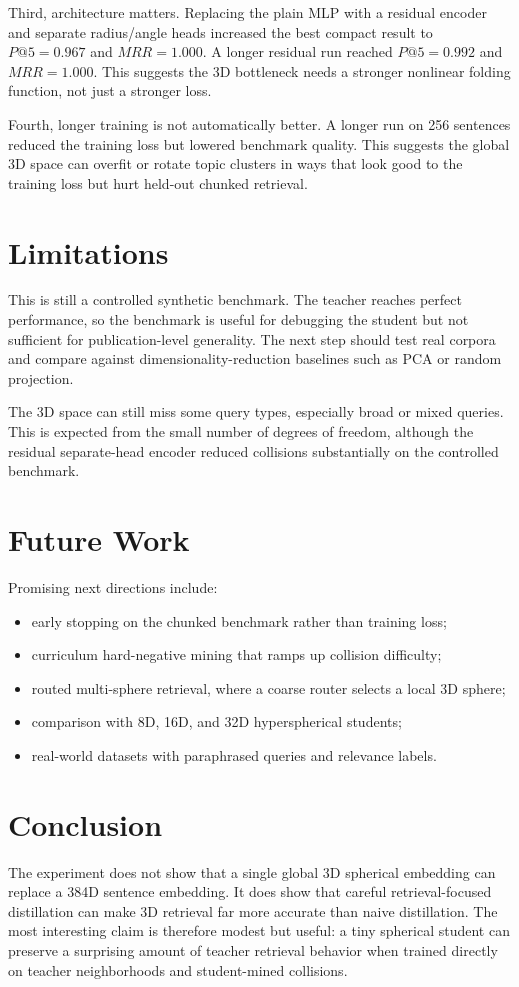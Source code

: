 \documentclass[11pt]{article}
\begin{document}
Third, architecture matters. Replacing the plain MLP with a residual encoder and separate radius/angle heads increased the best compact result to $P@5=0.967$ and $MRR=1.000$. A longer residual run reached $P@5=0.992$ and $MRR=1.000$. This suggests the 3D bottleneck needs a stronger nonlinear folding function, not just a stronger loss.

Fourth, longer training is not automatically better. A longer run on 256 sentences reduced the training loss but lowered benchmark quality. This suggests the global 3D space can overfit or rotate topic clusters in ways that look good to the training loss but hurt held-out chunked retrieval.

\section{Limitations}
This is still a controlled synthetic benchmark. The teacher reaches perfect performance, so the benchmark is useful for debugging the student but not sufficient for publication-level generality. The next step should test real corpora and compare against dimensionality-reduction baselines such as PCA or random projection.

The 3D space can still miss some query types, especially broad or mixed queries. This is expected from the small number of degrees of freedom, although the residual separate-head encoder reduced collisions substantially on the controlled benchmark.

\section{Future Work}
Promising next directions include:
\begin{itemize}
\item early stopping on the chunked benchmark rather than training loss;
\item curriculum hard-negative mining that ramps up collision difficulty;
\item routed multi-sphere retrieval, where a coarse router selects a local 3D sphere;
\item comparison with 8D, 16D, and 32D hyperspherical students;
\item real-world datasets with paraphrased queries and relevance labels.
\end{itemize}

\section{Conclusion}
The experiment does not show that a single global 3D spherical embedding can replace a 384D sentence embedding. It does show that careful retrieval-focused distillation can make 3D retrieval far more accurate than naive distillation. The most interesting claim is therefore modest but useful: a tiny spherical student can preserve a surprising amount of teacher retrieval behavior when trained directly on teacher neighborhoods and student-mined collisions.
\end{document}
